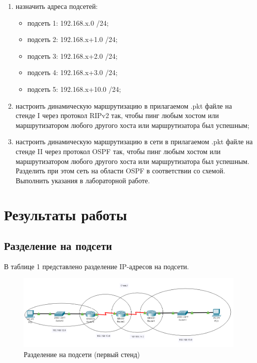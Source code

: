 \documentclass[12pt]{report}
\begin{document}
\begin{enumerate}
	\item назначить адреса подсетей:
	\begin{itemize}
		\item подсеть 1: 192.168.x.0 /24;
		\item подсеть 2: 192.168.x+1.0 /24;
		\item подсеть 3: 192.168.x+2.0 /24;
		\item подсеть 4: 192.168.x+3.0 /24;
		\item подсеть 5: 192.168.x+10.0 /24;
	\end{itemize}

	\item настроить динамическую маршрутизацию в прилагаемом .pkt файле на стенде I через протокол RIPv2 так, чтобы пинг любым хостом или маршрутизатором любого другого хоста или маршрутизатора был успешным;
	
	\item настроить динамическую маршрутизацию в сети в прилагаемом .pkt файле на стенде II через протокол OSPF так, чтобы пинг любым хостом или маршрутизатором любого другого хоста или маршрутизатора был успешным. Разделить при этом сеть на области OSPF в соответствии со схемой. Выполнить указания в лабораторной работе.
\end{enumerate}

\section*{Результаты работы}

\subsection*{Разделение на подсети}

В таблице 1 представлено разделение IP-адресов на подсети.

\begin{figure}[H]
	\begin{center}
		\includegraphics[scale=0.52]{img/1.png}
	\end{center}
	\caption{Разделение на подсети (первый стенд)}
	\label{fig:1}
\end{figure}
\end{document}

